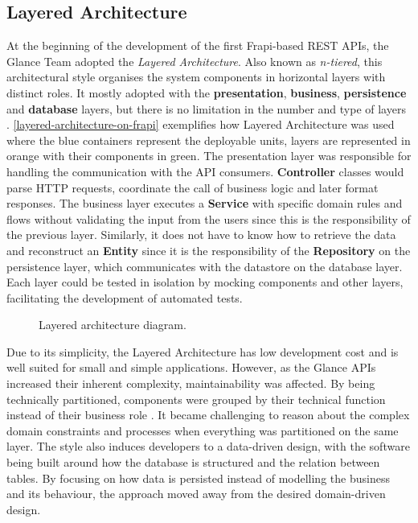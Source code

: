 \subsection{Layered Architecture}
\label{sec:layered-architecture}

At the beginning of the development of the first Frapi-based REST APIs, the Glance Team adopted the \textit{Layered Architecture}. Also known as \textit{n-tiered}, this architectural style organises the system components in horizontal layers with distinct roles. It mostly adopted with the \textbf{presentation}, \textbf{business}, \textbf{persistence} and \textbf{database} layers, but there is no limitation in the number and type of layers \cite{richards-architecture}. \autoref{layered-architecture-on-frapi} exemplifies how Layered Architecture was used where the blue containers represent the deployable units, layers are represented in orange with their components in green. The presentation layer was responsible for handling the communication with the API consumers. \textbf{Controller} classes would parse HTTP requests, coordinate the call of business logic and later format responses. The business layer executes a \textbf{Service} with specific domain rules and flows without validating the input from the users since this is the responsibility of the previous layer. Similarly, it does not have to know how to retrieve the data and reconstruct an \textbf{Entity} since it is the responsibility of the \textbf{Repository} on the persistence layer, which communicates with the datastore on the database layer. Each layer could be tested in isolation by mocking components and other layers, facilitating the development of automated tests.

\begin{figure}[htbp]
  \centering
  
  \caption{Layered architecture diagram.}
  \label{fig:layered-architecture-on-frapi}
\end{figure}

Due to its simplicity, the Layered Architecture has low development cost and is well suited for small and simple applications. However, as the Glance APIs increased their inherent complexity, maintainability was affected. By being technically partitioned, components were grouped by their technical function instead of their business role \cite{richards-architecture}. It became challenging to reason about the complex domain constraints and processes when everything was partitioned on the same layer. The style also induces developers to a data-driven design, with the software being built around how the database is structured and the relation between tables. By focusing on how data is persisted instead of modelling the business and its behaviour, the approach moved away from the desired domain-driven design.

